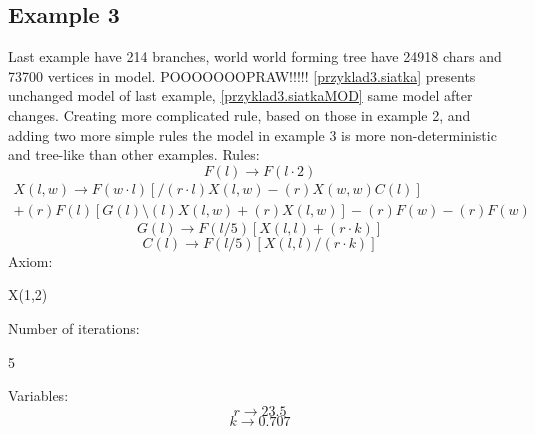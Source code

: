 \documentclass[b5paper,twoside,11pt]{article}
\begin{document}
\subsection*{Example 3}
Last example have 214 branches, world world forming tree have 24918 chars and 73700 vertices in model. POOOOOOOPRAW!!!!!
\figurename \ref{przyklad3.siatka} presents unchanged model of last example, \figurename \ref{przyklad3.siatkaMOD} same model after changes. Creating more complicated rule, based on those in example 2, and adding two more simple rules the model in example 3 is more non-deterministic and tree-like than other examples.
Rules: \newline
\begin{equation*}
F(l)\rightarrow F(l\cdot2) 
\end{equation*}
\begin{multline*}
X(l,w) \rightarrow F(w\cdot l)[/(r\cdot l)X(l,w)-(r)X(w,w)C(l)]\\
+(r)F(l)[G(l)\setminus(l)X(l,w)+(r)X(l,w)]-(r)F(w)-(r)F(w)
\end{multline*}
\begin{equation*}
G(l) \rightarrow F(l/5)[X(l,l)+(r\cdot k)]
\end{equation*}
\begin{equation*}
C(l) \rightarrow F(l/5)[X(l,l)/(r\cdot k)]
\end{equation*}
Axiom:
\begin{center}
X(1,2)
\end{center}
Number of iterations:
\begin{center}
5
\end{center}
Variables:
\begin{equation*}
r\rightarrow 23.5
\end{equation*}
\begin{equation*}
k\rightarrow 0.707
\end{equation*}
\end{document}
